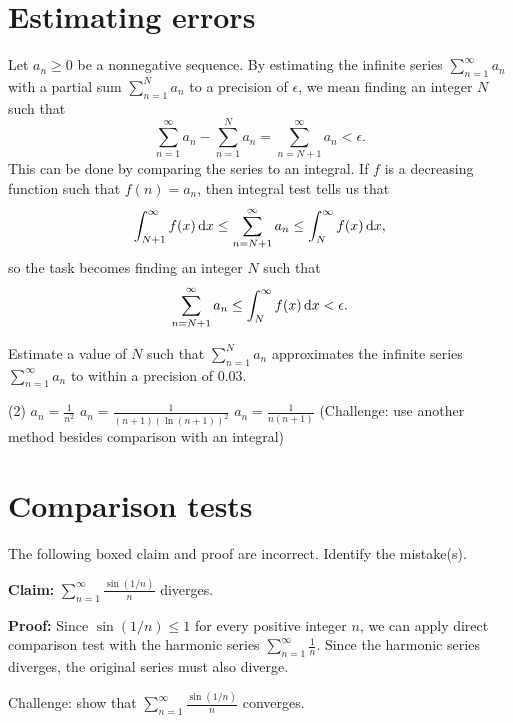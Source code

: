 \documentclass{discussion}
\begin{document}
\section{Estimating errors}

Let \(a_n \geq 0\) be a nonnegative sequence.
By estimating the infinite series \(\sum_{n=1}^\infty a_n\) with a partial sum \(\sum_{n=1}^{N} a_n\) to a precision of \(\epsilon\), we mean finding an integer \(N\) such that
\begin{equation*}
    \sum_{n=1}^\infty a_n - \sum_{n=1}^{N} a_n = \sum_{n=N+1}^\infty a_n < \epsilon.
\end{equation*}
This can be done by comparing the series to an integral.
If \(f\) is a decreasing function such that \(f(n) = a_n\), then integral test tells us that
\begin{equation*}
    \int_{N+1}^\infty f(x) \odif{x} \leq \sum_{n=N+1}^\infty a_n \leq \int_{N}^\infty f(x) \odif{x},
\end{equation*}
so the task becomes finding an integer \(N\) such that
\begin{equation*}
    \sum_{n=N+1}^\infty a_n \leq \int_{N}^\infty f(x) \odif{x} < \epsilon.
\end{equation*}

\begin{question}
    Estimate a value of \(N\) such that \(\sum_{n=1}^{N} a_n\) approximates the infinite series \(\sum_{n=1}^\infty a_n\) to within a precision of \(0.03\).
    \begin{tasks}(2)
        \task \(\displaystyle a_n = \frac{1}{n^2}\)
        \task \(\displaystyle a_n = \frac{1}{(n+1) (\ln (n+1))^2}\)
        \task* \(\displaystyle a_n = \frac{1}{n(n+1)}\) (Challenge: use another method besides comparison with an integral)
    \end{tasks}
\end{question}

\section{Comparison tests}

\begin{question}
    The following boxed claim and proof are incorrect.
    Identify the mistake(s).

    \begin{mdframed}
        \textbf{Claim:} \(\displaystyle \sum_{n=1}^{\infty} \frac{\sin(1/n)}{n}\) diverges.

        \noindent
        \textbf{Proof:}
        Since \(\sin(1/n) \leq 1\) for every positive integer \(n\), we can apply direct comparison test with the harmonic series \(\displaystyle \sum_{n=1}^{\infty} \frac{1}{n}\).
        Since the harmonic series diverges, the original series must also diverge.
    \end{mdframed}

    Challenge: show that \(\sum_{n=1}^{\infty} \frac{\sin(1/n)}{n}\) converges.
\end{question}
\end{document}
